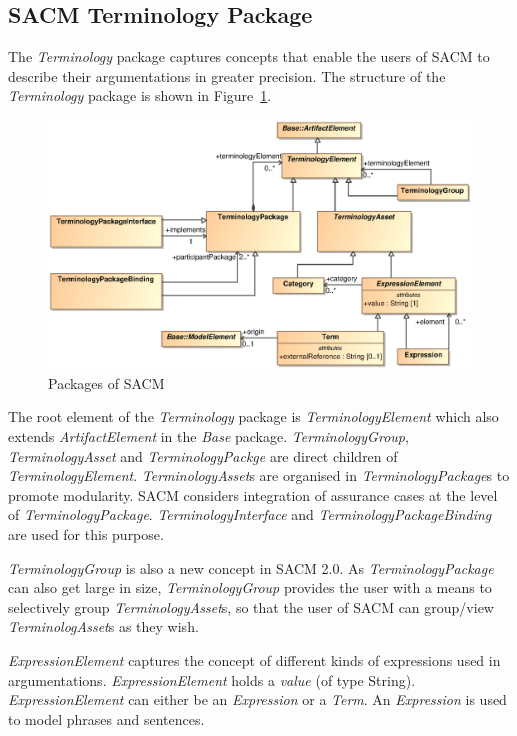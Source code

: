 \subsection{SACM Terminology Package}
\label{sec:termPack}
The \textit{Terminology} package captures concepts that enable the users of SACM to describe their argumentations in greater precision. The structure of the \textit{Terminology} package is shown in Figure~\ref{fig:term}.

\begin{figure}
	\centering
	\includegraphics[width=1\linewidth]{fig/Terminology.eps}
	\caption{Packages of SACM}
	\label{fig:term}
\end{figure}

The root element of the \textit{Terminology} package is \textit{TerminologyElement} which also extends \textit{ArtifactElement} in the \textit{Base} package. \textit{TerminologyGroup}, \textit{TerminologyAsset} and \textit{TerminologyPackge} are direct children of \textit{TerminologyElement}. \textit{TerminologyAsset}s are organised in \textit{TerminologyPackage}s to promote modularity. SACM considers integration of assurance cases at the level of \textit{TerminologyPackage}. \textit{TerminologyInterface} and \textit{TerminologyPackageBinding} are used for this purpose.

\textit{TerminologyGroup} is also a new concept in SACM 2.0. As \textit{TerminologyPackage} can also get large in size, \textit{TerminologyGroup} provides the user with a means to selectively group \textit{TerminologyAsset}s, so that the user of SACM can group/view \textit{TerminologAsset}s as they wish.

\textit{ExpressionElement} captures the concept of different kinds of expressions used in argumentations. \textit{ExpressionElement} holds a \textit{value} (of type String). \textit{ExpressionElement} can either be an \textit{Expression} or a \textit{Term}. An \textit{Expression} is used to model phrases and sentences. 
